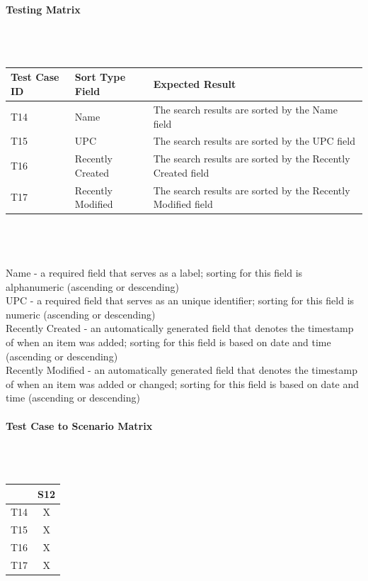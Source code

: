 \documentclass{article}
\begin{document}
\paragraph{Testing Matrix}~\\ \\
\begin{tabular}{ p{0.8in}  p{1.1in}  p{3.6in} }
\hline
Test Case ID & Sort Type Field & Expected Result\\
\hline
\hline
T14 & Name & The search results are sorted by the Name field\\
\hline
T15 & UPC & The search results are sorted by the UPC field\\
\hline
T16 & Recently Created & The search results are sorted by the Recently Created field\\
\hline
T17 & Recently Modified & The search results are sorted by the Recently Modified field\\
\hline
\end{tabular}\\
~\\
~\\
Name - a required field that serves as a label; sorting for this field is alphanumeric (ascending or descending)\\
UPC - a required field that serves as an unique identifier; sorting for this field is numeric (ascending or descending)\\
Recently Created - an automatically generated field that denotes the timestamp of when an item was added; sorting for this field is based on date and time (ascending or descending)\\
Recently Modified - an automatically generated field that denotes the timestamp of when an item was added or changed; sorting for this field is based on date and time (ascending or descending)
\paragraph{Test Case to Scenario Matrix}~\\ \\
\begin{tabular}{ | c || c | }
\hline
    & S12 \\
\hline
\hline
T14 &  X  \\
\hline
T15 &  X  \\
\hline
T16 &  X  \\
\hline
T17 &  X  \\
\hline
\end{tabular}
\end{document}
